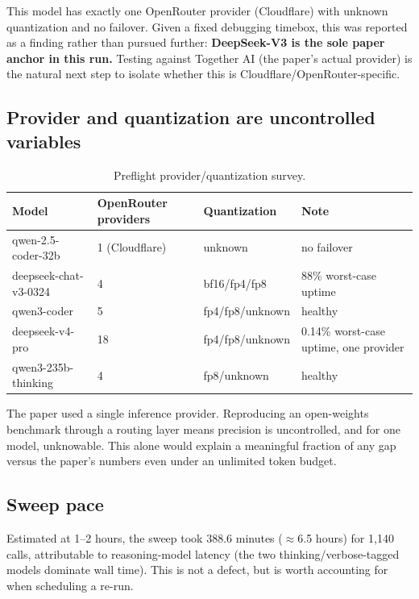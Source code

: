 \documentclass[11pt]{article}
\begin{document}
This model has exactly one OpenRouter provider (Cloudflare) with
unknown quantization and no failover. Given a fixed debugging timebox,
this was reported as a finding rather than pursued further:
\textbf{DeepSeek-V3 is the sole paper anchor in this run.} Testing
against Together AI (the paper's actual provider) is the natural next
step to isolate whether this is Cloudflare/OpenRouter-specific.

\subsection{Provider and quantization are uncontrolled variables}

\begin{table}[h]
\centering
\begin{tabular}{@{}llll@{}}
\toprule
\textbf{Model} & \textbf{OpenRouter providers} & \textbf{Quantization} & \textbf{Note} \\
\midrule
qwen-2.5-coder-32b & 1 (Cloudflare) & unknown & no failover \\
deepseek-chat-v3-0324 & 4 & bf16/fp4/fp8 & 88\% worst-case uptime \\
qwen3-coder & 5 & fp4/fp8/unknown & healthy \\
deepseek-v4-pro & 18 & fp4/fp8/unknown & 0.14\% worst-case uptime, one provider \\
qwen3-235b-thinking & 4 & fp8/unknown & healthy \\
\bottomrule
\end{tabular}
\caption{Preflight provider/quantization survey.}
\label{tab:providers}
\end{table}

The paper used a single inference provider. Reproducing an open-weights
benchmark through a routing layer means precision is uncontrolled, and
for one model, unknowable. This alone would explain a meaningful
fraction of any gap versus the paper's numbers even under an unlimited
token budget.

\subsection{Sweep pace}

Estimated at 1--2 hours, the sweep took 388.6 minutes ($\approx$6.5
hours) for 1{,}140 calls, attributable to reasoning-model latency (the
two thinking/verbose-tagged models dominate wall time). This is not a
defect, but is worth accounting for when scheduling a re-run.
\end{document}
